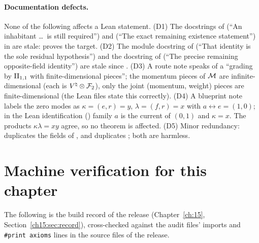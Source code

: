 \paragraph{Documentation defects.}  None of the following affects a Lean statement.
(D1) The docstrings of  (``An inhabitant \dots\ is still required'') and
 (``The exact remaining existence statement'') in
 are stale:  proves the target.
(D2) The module docstring of  (``That identity is the sole
residual hypothesis'') and the docstring of  (``The precise remaining opposite-field identity'')
are stale since .  (D3) A route note speaks of a ``grading by ${\mathrm{II}_{1,1}}$ with finite-dimensional pieces''; the momentum pieces of $\mathcal{M}$ are
infinite-dimensional (each is ${V^{\natural}}\otimes\mathcal{F}_2$), only the joint (momentum, weight) pieces are finite-dimensional
(the Lean files state this correctly).  (D4) A blueprint note labels the
zero modes as $\kappa=(e,r)=y$, $\lambda=(f,r)=x$ with $a\leftrightarrow e=(1,0)$; in the Lean identification
() family $a$ is the current of $(0,1)$ and $\kappa=x$.  The products $\kappa\lambda=xy$ agree,
so no theorem is affected.  (D5) Minor redundancy:  duplicates the fields of
, and  duplicates ; both are harmless.

\section{Machine verification for this chapter}\label{ch17:sec:audit}

The following is the build record of the release (Chapter~\ref{ch:15}, Section~\ref{ch15:sec:record}), cross-checked
against the audit files' imports and \texttt{\#print axioms} lines in the source files of the release.

